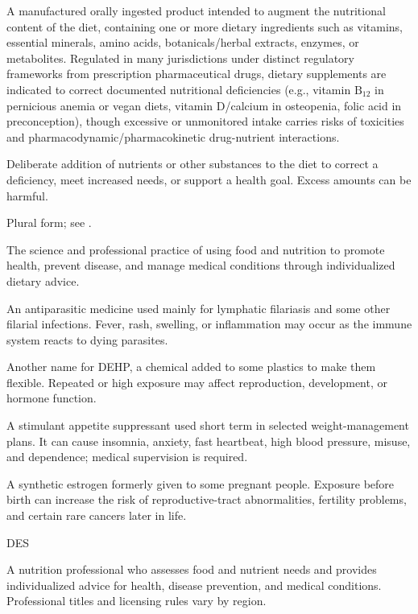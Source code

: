  A manufactured orally ingested product intended to augment the nutritional content of the diet, containing one or more dietary ingredients such as vitamins, essential minerals, amino acids, botanicals/herbal extracts, enzymes, or metabolites. Regulated in many jurisdictions under distinct regulatory frameworks from prescription pharmaceutical drugs, dietary supplements are indicated to correct documented nutritional deficiencies (e.g., vitamin $\text{B}_{12}$ in pernicious anemia or vegan diets, vitamin D/calcium in osteopenia, folic acid in preconception), though excessive or unmonitored intake carries risks of toxicities and pharmacodynamic/pharmacokinetic drug-nutrient interactions.

 Deliberate addition of nutrients or other substances to the diet to correct a deficiency, meet increased needs, or support a health goal. Excess amounts can be harmful.

 Plural form; see .

 The science and professional practice of using food and nutrition to promote health, prevent disease, and manage medical conditions through individualized dietary advice.

 An antiparasitic medicine used mainly for lymphatic filariasis and some other filarial infections. Fever, rash, swelling, or inflammation may occur as the immune system reacts to dying parasites.

 Another name for DEHP, a chemical added to some plastics to make them flexible. Repeated or high exposure may affect reproduction, development, or hormone function.

 A stimulant appetite suppressant used short term in selected weight-management plans. It can cause insomnia, anxiety, fast heartbeat, high blood pressure, misuse, and dependence; medical supervision is required.

 A synthetic estrogen formerly given to some pregnant people. Exposure before birth can increase the risk of reproductive-tract abnormalities, fertility problems, and certain rare cancers later in life.

\synonyms
DES

 A nutrition professional who assesses food and nutrient needs and provides individualized advice for health, disease prevention, and medical conditions. Professional titles and licensing rules vary by region.

